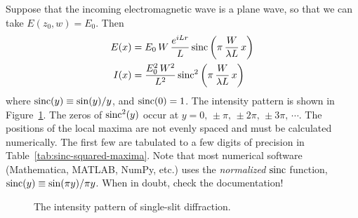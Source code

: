 \documentclass[]{manual}
\begin{document}
    Suppose that the incoming electromagnetic wave is a plane wave, so that we can take $E(z_0, w) = E_0$.
    Then
    \begin{align} \label{eqn:single-slit-diffraction}
        E(x) &= E_0 \, W \, \frac{e^{i L r}}{L} \operatorname{sinc}\qty(\pi \, \frac{W}{\lambda L} \, x) \nonumber \\
        I(x) &= \frac{E_0^2 \, W^2}{L^2} \operatorname{sinc}^2\qty(\pi \, \frac{W}{\lambda L} \, x)
    \end{align}
    where $\operatorname{sinc}(y) \equiv \sin(y) / y$, and $\operatorname{sinc}(0) = 1$.
    The intensity pattern is shown in Figure~\ref{fig:single-slit-diffraction-intensity}.
    The zeros of $\operatorname{sinc}^2(y)$ occur at $y = 0, \, \pm \pi, \, \pm 2 \pi, \, \pm 3 \pi, \, \cdots$.
    The positions of the local maxima are not evenly spaced and must be calculated numerically.
    The first few are tabulated to a few digits of precision in Table~\ref{tab:sinc-squared-maxima}.
    Note that most numerical software (Mathematica, MATLAB, NumPy, etc.) uses the \textit{normalized} $\operatorname{sinc}$ function, $\operatorname{sinc}(y) \equiv \sin(\pi y) / \pi y$.
    When in doubt, check the documentation!
    \begin{figure}
        \centering


        \caption{The intensity pattern of single-slit diffraction.}
        \label{fig:single-slit-diffraction-intensity}
    \end{figure}
\end{document}

